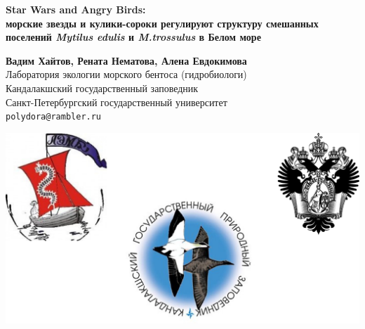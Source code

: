 \documentclass[a0,portrait]{a0poster}
\begin{document}

	
	
	
	
	
	\begin{minipage}[b]{0.95\linewidth}
	\center
	
		\veryHuge \color{NavyBlue} \textbf{Star Wars and Angry Birds:}\\ 
		\Huge \color{NavyBlue} \textbf{морские звезды и кулики-сороки регулируют структуру смешанных поселений \emph{Mytilus edulis} и \emph{M.trossulus} в Белом море } \color{NavyBlue}\\ %
	\end{minipage}

\vspace{1cm}
	\begin{minipage}[b]{0.75\linewidth}
		\Large \textbf{Вадим Хайтов,  Рената Нематова, Алена Евдокимова}\\[0.5cm] %
		\large Лаборатория экологии морского бентоса (гидробиологи)\\[0.4cm] %
		\large Кандалакшский государственный заповедник\\[0.4cm] %
		\large Санкт-Петербургский государственный университет\\[0.4cm] %
		\large \texttt{polydora@rambler.ru}\\
	\end{minipage}
	\begin{minipage}[b]{0.25\linewidth}
		\includegraphics[width=15 cm]{logos.jpg}\\
	\end{minipage}
	
\end{document}
